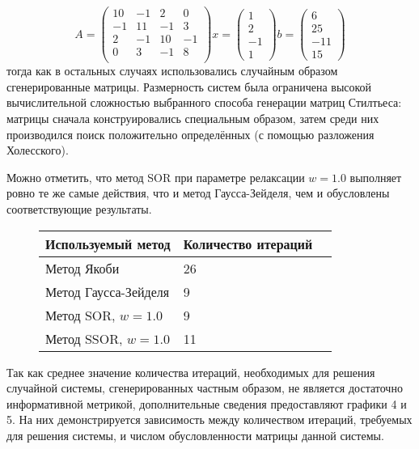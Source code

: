 \begin{equation} \label{sys:1}
	A = \begin{pmatrix}
		10 & -1  & 2  & 0  \\
		-1 &  11 & -1 & 3  \\
		2  & -1  & 10 & -1 \\
		0  & 3   & -1 & 8  \\
	\end{pmatrix}
	x = \begin{pmatrix}
		1 \\ 2 \\ -1 \\ 1
	\end{pmatrix}
	b = \begin{pmatrix}
		6 \\ 25 \\ -11 \\ 15
	\end{pmatrix}
\end{equation}
тогда как в остальных случаях использовались случайным образом сгенерированные матрицы. Размерность систем была ограничена высокой вычислительной сложностью выбранного способа генерации матриц Стилтьеса: матрицы сначала конструировались специальным образом, затем среди них производился поиск положительно определённых (с помощью разложения Холесского). 

Можно отметить, что метод SOR при параметре релаксации $w=1.0$ выполняет ровно те же самые действия, что и метод Гаусса-Зейделя, чем и обусловлены соответствующие результаты. 

\begin{figure}[ht]
	\begin{center}
   		\begin{tabular}{ | l | l | p{5cm} |}
    	\hline
    	Используемый метод   & Количество итераций  \\ \hline
    	Метод Якоби          & 26  \\ \hline
    	Метод Гаусса-Зейделя & 9  \\ \hline
    	Метод SOR, $w=1.0$   & 9  \\ \hline
    	Метод SSOR, $w=1.0$  & 11  \\ \hline
    	\end{tabular}
	\end{center}
\end{figure}


Так как среднее значение количества итераций, необходимых для решения случайной системы, сгенерированных частным образом, не является достаточно информативной метрикой, дополнительные сведения предоставляют графики 4 и 5. На них демонстрируется зависимость между количеством итераций, требуемых для решения системы, и числом обусловленности матрицы данной системы.

